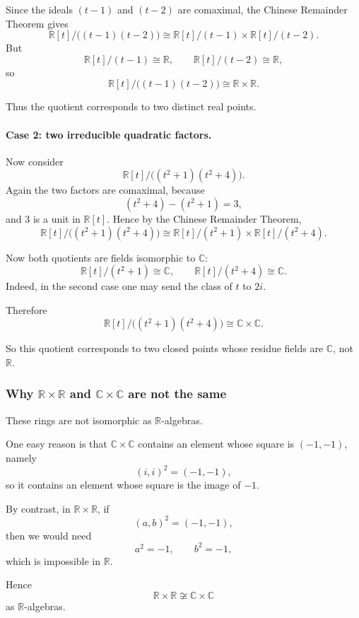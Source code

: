 \documentclass[12pt,a4paper]{article}
\theoremstyle{notespace}
\theoremstyle{definition}
\begin{document}
Since the ideals \((t-1)\) and \((t-2)\) are comaximal, the Chinese Remainder Theorem gives
\[
\mathbb{R}[t]/\bigl((t-1)(t-2)\bigr)
\cong
\mathbb{R}[t]/(t-1)\times \mathbb{R}[t]/(t-2).
\]
But
\[
\mathbb{R}[t]/(t-1)\cong \mathbb{R},
\qquad
\mathbb{R}[t]/(t-2)\cong \mathbb{R},
\]
so
\[
\mathbb{R}[t]/\bigl((t-1)(t-2)\bigr)\cong \mathbb{R}\times \mathbb{R}.
\]

Thus the quotient corresponds to two distinct real points.

\paragraph{Case 2: two irreducible quadratic factors.}

Now consider
\[
\mathbb{R}[t]/\bigl((t^2+1)(t^2+4)\bigr).
\]
Again the two factors are comaximal, because
\[
(t^2+4)-(t^2+1)=3,
\]
and \(3\) is a unit in \(\mathbb{R}[t]\). Hence by the Chinese Remainder Theorem,
\[
\mathbb{R}[t]/\bigl((t^2+1)(t^2+4)\bigr)
\cong
\mathbb{R}[t]/(t^2+1)\times \mathbb{R}[t]/(t^2+4).
\]

Now both quotients are fields isomorphic to \(\mathbb{C}\):
\[
\mathbb{R}[t]/(t^2+1)\cong \mathbb{C},
\qquad
\mathbb{R}[t]/(t^2+4)\cong \mathbb{C}.
\]
Indeed, in the second case one may send the class of \(t\) to \(2i\).

Therefore
\[
\mathbb{R}[t]/\bigl((t^2+1)(t^2+4)\bigr)\cong \mathbb{C}\times \mathbb{C}.
\]

So this quotient corresponds to two closed points whose residue fields are \(\mathbb{C}\), not \(\mathbb{R}\).

\subsubsection{Why \(\mathbb{R}\times\mathbb{R}\) and \(\mathbb{C}\times\mathbb{C}\) are not the same}

These rings are not isomorphic as \(\mathbb{R}\)-algebras.

One easy reason is that \(\mathbb{C}\times \mathbb{C}\) contains an element whose square is \((-1,-1)\), namely
\[
(i,i)^2=(-1,-1),
\]
so it contains an element whose square is the image of \(-1\).

By contrast, in \(\mathbb{R}\times \mathbb{R}\), if
\[
(a,b)^2=(-1,-1),
\]
then we would need
\[
a^2=-1,\qquad b^2=-1,
\]
which is impossible in \(\mathbb{R}\).

Hence
\[
\mathbb{R}\times \mathbb{R}\not\cong \mathbb{C}\times \mathbb{C}
\]
as \(\mathbb{R}\)-algebras.
\end{document}
